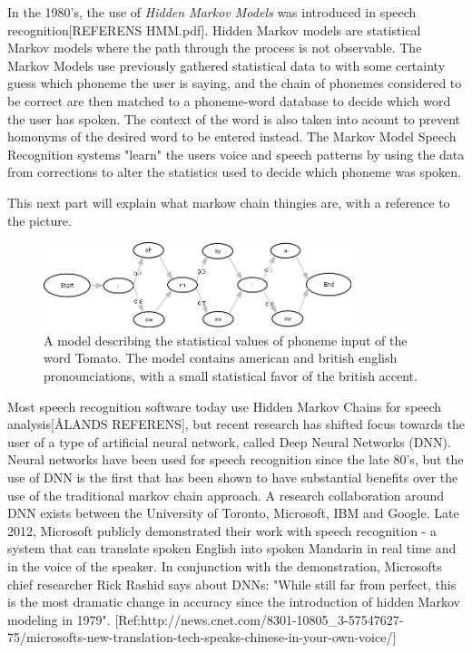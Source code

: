 In the 1980's, the use of \emph{Hidden Markov Models} was introduced in speech recognition[REFERENS HMM.pdf]. Hidden Markov models are statistical Markov models where the path through the process is not observable. The Markov Models use previously gathered statistical data to with some certainty guess which phoneme the user is saying, and the chain of phonemes considered to be correct are then matched to a phoneme-word database to decide which word the user has spoken. The context of the word is also taken into acount to prevent homonyms of the desired word to be entered instead. The Markov Model Speech Recognition systems "learn" the users voice and speech patterns by using the data from corrections to alter the statistics used to decide which phoneme was spoken. 

This next part will explain what markow chain thingies are, with a reference to the picture.

\begin{figure}[]
\includegraphics[width=0.8\textwidth] {bilder/tomato.jpg}
\caption{A model describing the statistical values of phoneme input of the word Tomato. The model contains american and british english pronounciations, with a small statistical favor of the british accent.}
\label{ibooks}
\end{figure}

Most speech recognition software today use Hidden Markov Chains for speech analysis[ÅLANDS REFERENS], but recent research has shifted focus towards the user of a type of artificial neural network, called Deep Neural Networks (DNN). Neural networks have been used for speech recognition since the late 80's, but the use of DNN is the first that has been shown to have substantial benefits over the use of the traditional markov chain approach. A research collaboration around DNN exists between the University of Toronto, Microsoft, IBM and Google. Late 2012, Microsoft publicly demonstrated their work with speech recognition - a system that can translate spoken English into spoken Mandarin in real time and in the voice of the speaker. In conjunction with the demonstration, Microsofts chief researcher Rick Rashid says about DNNs: "While still far from perfect, this is the most dramatic change in accuracy since the introduction of hidden Markov modeling in 1979". [Ref:http://news.cnet.com/8301-10805\_3-57547627-75/microsofts-new-translation-tech-speaks-chinese-in-your-own-voice/]

